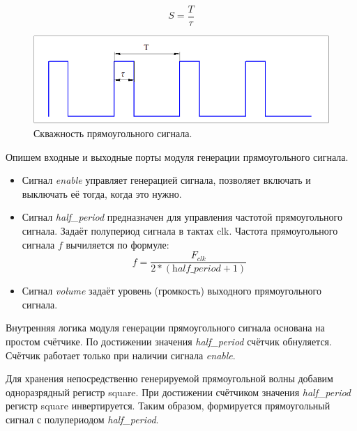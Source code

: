 $$ S = \frac{T}{\tau} $$


\begin{figure}[H]
	\centering
	\includegraphics [width=1\textwidth] {images/lab_7/duty_cycle.png}
	\caption{Скважность прямоугольного сигнала.}
	\label{lab7:pic4}
\end{figure}


Опишем входные и выходные порты модуля генерации прямоугольного сигнала.

\noindent
\begin{minipage}{\linewidth}
	
\end{minipage}

\begin{itemize}
	\item Сигнал \textit{enable} управляет генерацией сигнала, позволяет включать и выключать её тогда, когда это нужно.
	\item Сигнал \textit{half\_period} предназначен для управления частотой прямоугольного сигнала. Задаёт полупериод сигнала в тактах clk. Частота прямоугольного сигнала $f$ вычиляется по формуле: 
	$$ f = \frac{F_{clk}}{2* (\textit{half\_period} + 1)} $$
	\item Сигнал \textit{volume} задаёт уровень (громкость) выходного прямоугольного сигнала.

\end{itemize}


Внутренняя логика модуля генерации прямоугольного сигнала основана на простом счётчике. По достижении значения \textit{half\_period} счётчик обнуляется. Счётчик работает только при наличии сигнала \textit{enable}.

\noindent
\begin{minipage}{\linewidth}
	
\end{minipage}

Для хранения непосредственно генерируемой прямоугольной волны добавим одноразрядный регистр square.
При достижении счётчиком значения \textit{half\_period} регистр square инвертируется. Таким образом, формируется прямоугольный сигнал с полупериодом \textit{half\_period}.


